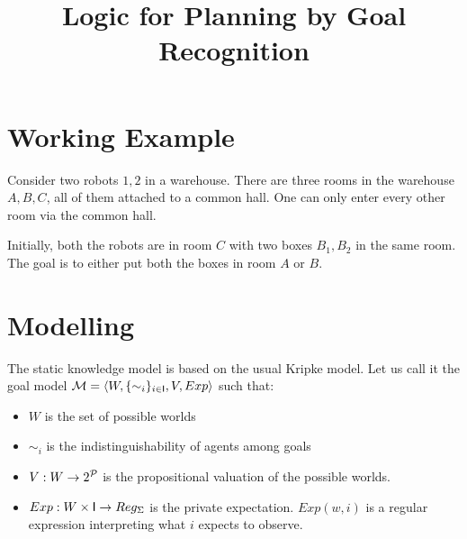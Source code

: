 \documentclass{article}
\title{Logic for Planning by Goal Recognition}
\author{}
\begin{document}
\maketitle


\section{Working Example}
Consider two robots $1, 2$ in a warehouse. There are three rooms in the warehouse $A, B, C$, all of them attached to a common hall. One can only enter every other room via the common hall. 

Initially, both the robots are in room $C$ with two boxes $B_1, B_2$ in the same room. The goal is to either put both the boxes in room $A$ or $B$.

\section{Modelling}
\begin{definition}
    The static knowledge model is based on the usual Kripke model. Let us call it the goal model $\mathcal{M} = \langle W, \{\sim_i\}_{i\in\mathsf{I}}, V, Exp\rangle$ such that:
    \begin{itemize}
        \item $W$ is the set of possible worlds
        \item $\sim_i$ is the indistinguishability of agents among goals
        \item $V: W\rightarrow 2^{\mathcal{P}}$ is the propositional valuation of the possible worlds.
        \item $Exp: W\times \mathsf{I}\rightarrow Reg_{\Sigma}$ is the private expectation. $Exp(w, i)$ is a regular expression interpreting what $i$ expects to observe.
    \end{itemize}
\end{definition}
\end{document}

